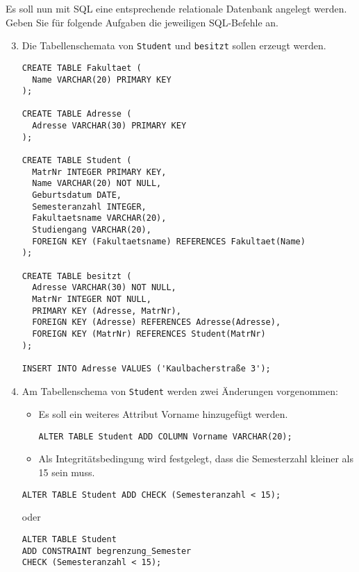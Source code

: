 \documentclass{bschlangaul-aufgabe}
\begin{document}
\noindent
Es soll nun mit SQL eine entsprechende relationale Datenbank
angelegt werden. Geben Sie für folgende Aufgaben die jeweiligen
SQL-Befehle an.

\begin{enumerate}
\setcounter{enumi}{2}

\item Die Tabellenschemata von \texttt{Student} und \texttt{besitzt}
sollen erzeugt werden.

\begin{liAntwort}
\begin{verbatim}
CREATE TABLE Fakultaet (
  Name VARCHAR(20) PRIMARY KEY
);

CREATE TABLE Adresse (
  Adresse VARCHAR(30) PRIMARY KEY
);

CREATE TABLE Student (
  MatrNr INTEGER PRIMARY KEY,
  Name VARCHAR(20) NOT NULL,
  Geburtsdatum DATE,
  Semesteranzahl INTEGER,
  Fakultaetsname VARCHAR(20),
  Studiengang VARCHAR(20),
  FOREIGN KEY (Fakultaetsname) REFERENCES Fakultaet(Name)
);

CREATE TABLE besitzt (
  Adresse VARCHAR(30) NOT NULL,
  MatrNr INTEGER NOT NULL,
  PRIMARY KEY (Adresse, MatrNr),
  FOREIGN KEY (Adresse) REFERENCES Adresse(Adresse),
  FOREIGN KEY (MatrNr) REFERENCES Student(MatrNr)
);

INSERT INTO Adresse VALUES ('Kaulbacherstraße 3');

\end{verbatim}
\end{liAntwort}

\item Am Tabellenschema von \texttt{Student} werden zwei Änderungen
vorgenommen:

\begin{itemize}
\item Es soll ein weiteres Attribut Vorname hinzugefügt werden.

\begin{liAntwort}
\begin{verbatim}
ALTER TABLE Student ADD COLUMN Vorname VARCHAR(20);
\end{verbatim}
\end{liAntwort}

\item Als Integritätsbedingung wird festgelegt, dass die Semesterzahl
kleiner als 15 sein muss.
\end{itemize}

\begin{liAntwort}
\begin{verbatim}
ALTER TABLE Student ADD CHECK (Semesteranzahl < 15);
\end{verbatim}

oder

\begin{verbatim}
ALTER TABLE Student
ADD CONSTRAINT begrenzung_Semester
CHECK (Semesteranzahl < 15);
\end{verbatim}
\end{liAntwort}

\end{enumerate}
\end{document}
